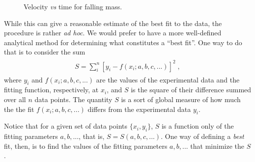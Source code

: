 \documentclass[letterpaper,10pt,english]{sphinxmanual}
\begin{document}
\begin{figure}[htbp]
\centering
\capstart

\caption{Velocity \emph{vs} time for falling mass.}\label{chap7/chap7_funcs:fig-fallingmassdataplot}\end{figure}

While this can give a reasonable estimate of the best fit to the data, the procedure is rather \emph{ad hoc}.  We would prefer to have a more well-defined analytical method for determining what constitutes a ``best fit''.  One way to do that is to consider the sum
\label{chap7/chap7_funcs:equation-eq:lsqrsum}\begin{gather}
\begin{split}S = \sum_{i}^{n} [y_{i} - f(x_{i}; a, b, c, ...)]^2 \;,\end{split}\label{chap7/chap7_funcs-eq:lsqrsum}
\end{gather}
where \(y_{i}\) and \(f(x_{i}; a, b, c, ...)\) are the values of the experimental data and the fitting function, respectively, at \(x_{i}\), and \(S\) is the square of their difference summed over all \(n\) data points.  The quantity \(S\) is a sort of global measure of how much the the fit \(f(x_{i}; a, b, c, ...)\) differs from the experimental data \(y_{i}\).

Notice that for a given set of data points \(\{x_i, y_i\}\), \(S\) is a function only of the fitting parameters \(a, b, ...\), that is, \(S=S(a, b, c, ...)\).  One way of defining a \emph{best} fit, then, is to find the values of the fitting parameters \(a, b, ...\) that minimize the \(S\).
\end{document}
